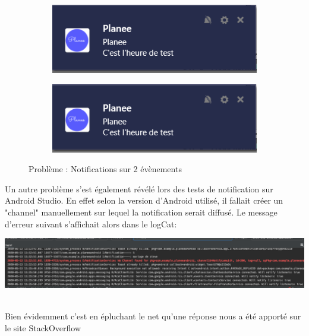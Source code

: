 \documentclass[12pt,a4paper]{report}
\begin{document}
\begin{flushleft}
\begin{figure}[!h]
    \centering
    \begin{subfigure}[b]{0.3\textwidth}
        \includegraphics[width=\textwidth]{Notif}
    \end{subfigure}
    \begin{subfigure}[b]{0.3\textwidth}
        \includegraphics[width=\textwidth]{Notif}
    \end{subfigure}
    \caption{Problème : Notifications sur 2 évènements}
\end{figure}
\justify
Un autre problème s'est également révélé lors des tests de notification sur Android Studio. En effet selon la version d'Android utilisé, il fallait créer un "channel" manuellement sur lequel la notification serait diffusé. Le message d'erreur suivant s'affichait alors dans le logCat:
\\

\begin{minipage}{\linewidth}
\centering
\includegraphics[scale=0.3]{logCatNotif}
\end{minipage}\\
Bien évidemment c'est en épluchant le net qu'une réponse nous a été apporté sur le site StackOverflow\cite{2}
\end{flushleft}
\end{document}
